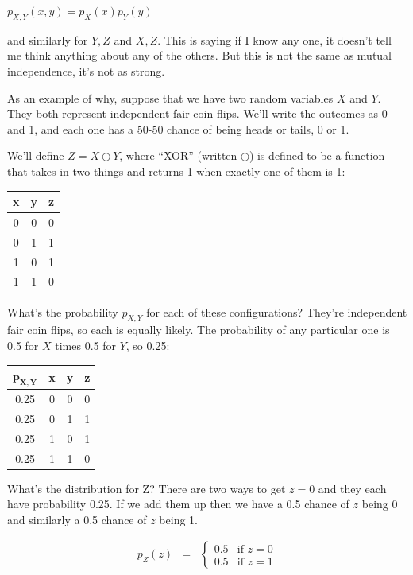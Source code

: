 \documentclass[6008notes.tex]{subfiles}
\begin{document}
{\centering$p_{X,Y} (x,y) = p_X(x) p_Y(y)$ \par}

and similarly for $Y,Z$ and $X,Z$. This is saying if I know any one, it doesn't tell me think anything about any of the others. But this is not the same as mutual independence, it's not as strong.

As an example of why, suppose that we have two random variables $X$ and $Y$. They both represent independent fair coin flips. We'll write the outcomes as 0 and 1, and each one has a 50-50 chance of being heads or tails, 0 or 1.

We'll define $Z = X \oplus Y$, where ``XOR'' (written $\oplus$) is defined to be a function that takes in two things and returns 1 when exactly one of them is 1:

\begin{center}
\begin{tabular}{| c | c | c }
\textbf{x} & \textbf{y} & \textbf{z} \\
\hline
0 &	0 &	0 \\
0 &	1 &	1 \\
1 &	0 &	1 \\
1 &	1 &	0 \\
\end{tabular}
\end{center}

What's the probability $p_{X,Y}$ for each of these configurations? They're independent fair coin flips, so each is equally likely. The probability of any particular one is 0.5 for $X$ times 0.5 for $Y$, so 0.25:

\begin{center}
\begin{tabular}{| c | c | c | c }
$\mathbf{p_{X,Y}}$ & \textbf{x} & \textbf{y} & \textbf{z} \\
\hline
0.25 & 0 &	0 &	0 \\
0.25 & 0 &	1 &	1 \\
0.25 & 1 &	0 &	1 \\
0.25 & 1 &	1 &	0 \\
\end{tabular}
\end{center}

What's the distribution for Z? There are two ways to get $z=0$ and they each have probability 0.25. If we add them up then we have a 0.5 chance of $z$ being 0 and similarly a 0.5 chance of $z$ being 1. 

\begin{eqnarray*}
p_Z(z)
&=&
\begin{cases}
  0.5 & \text{if }z=0 \\
  0.5 & \text{if }z=1
\end{cases}
\end{eqnarray*}
\end{document}
